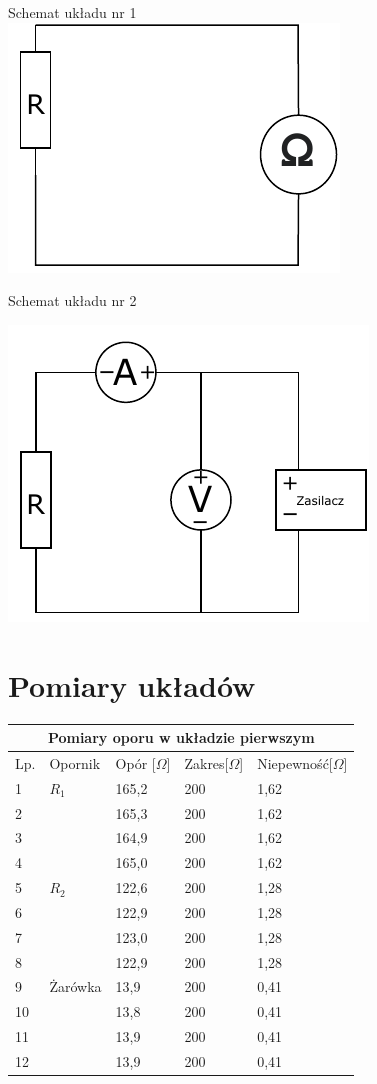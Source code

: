 \documentclass[12pt]{article}
\begin{document}
\pagebreak Schemat układu nr 1 \\

\includegraphics{obwod1.pdf}

Schemat układu nr 2

\includegraphics{obwod2.pdf}

\section{Pomiary układów}

\begin{tabular}{ |p{0.5cm}|p{2cm}|p{3cm}|p{3cm}|p{3cm}| }
    \hline
    \multicolumn{5}{|c|}{Pomiary oporu w układzie pierwszym} \\
    \hline
    Lp. &Opornik& Opór [$\Omega$] & Zakres[$\Omega$] & Niepewność[$\Omega$] \\ 
    \hline
    1 & $R_1$ & 165,2 & 200 & 1,62 \\
    2 && 165,3 & 200 & 1,62 \\
    3 && 164,9 & 200 & 1,62 \\
    4 && 165,0 & 200 & 1,62 \\
    \hline
    5& $R_2$ & 122,6 & 200 & 1,28\\
    6&& 122,9 & 200 & 1,28 \\
    7&& 123,0 & 200 & 1,28 \\
    8&& 122,9 & 200 & 1,28 \\
    \hline
    9& Żarówka & 13,9 & 200 & 0,41 \\
    10&& 13,8 & 200 & 0,41\\
    11&& 13,9 & 200 & 0,41\\
    12&& 13,9 & 200 & 0,41\\
    \hline
\end{tabular}
\end{document}
